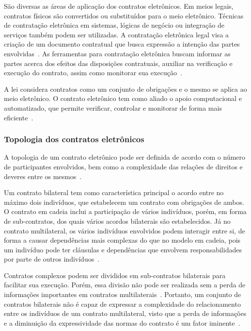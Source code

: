 São diversas as áreas de aplicação dos contratos eletrônicos. Em meios legais, contratos físicos são convertidos ou substituídos para o meio eletrônico. Técnicas de contratação eletrônica em sistemas, lógicas de negócio ou integração de serviços também podem ser utilizadas. A contratação eletrônica legal visa a criação de um documento contratual que busca expressão a intenção das partes envolvidas~\cite{xu2004monitoring}. As ferramentas para contratação eletrônica buscam informar as partes acerca dos efeitos das disposições contratuais, auxiliar na verificação e execução do contrato, assim como monitorar sua execução~\cite{mura2016}.

A lei considera contratos como um conjunto de obrigações e o mesmo se aplica ao meio eletrônico. O contrato eletrônico tem como aliado o apoio computacional e automatizado, que permite verificar, controlar e monitorar de forma mais eficiente~\cite{mura2016}.

\subsubsection*{Topologia dos contratos eletrônicos}

A topologia de um contrato eletrônico pode ser definida de acordo com o número de participantes envolvidos, bem como a complexidade das relações de direitos e deveres entre os mesmos~\cite{angelov2001b2b}. 

Um contrato bilateral tem como característica principal o acordo entre no máximo dois indivíduos, que estabelecem um contrato com obrigações de ambos. O contrato em cadeia inclui a participação de vários indivíduos, porém, em forma de sub-contratos, dos quais vários acordos bilaterais são estabelecidos. Já no contrato multilateral, os vários indivíduos envolvidos podem interagir entre si, de forma a causar dependências mais complexas do que no modelo em cadeia, pois um indivíduo pode ter cláusulas e dependências que envolvem responsabilidades por parte de outros indivíduos~\cite{mura2016}.

Contratos complexos podem ser divididos em sub-contratos bilaterais para facilitar sua execução. Porém, essa divisão não pode ser realizada sem a perda de informações importantes em contratos multilaterais~\cite{xu2004multi}. Portanto, um conjunto de contratos bilaterais não é capaz de expressar a complexidade do relacionamento entre os indivíduos de um contrato multilateral, visto que a perda de informações e a diminuição da expressividade das normas do contrato é um fator iminente~\cite{mura2016}.  

